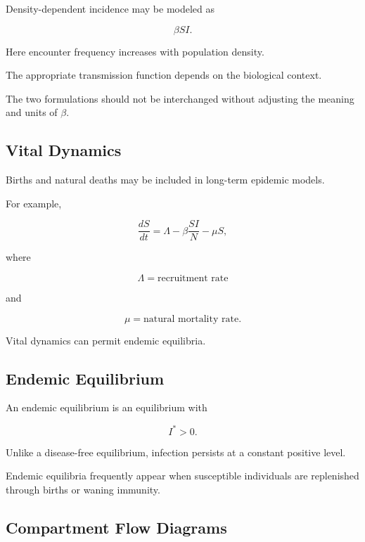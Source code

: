 Density-dependent incidence may be modeled as

\[
\boxed{
\beta SI.
}
\]

Here encounter frequency increases with population density.

The appropriate transmission function depends on the biological context.

The two formulations should not be interchanged without adjusting the
meaning and units of \(\beta\).

\subsection{Vital Dynamics}
\label{subsec:epidemic-vital-dynamics}

Births and natural deaths may be included in long-term epidemic models.

For example,

\[
\frac{dS}{dt}
=
\Lambda
-
\beta\frac{SI}{N}
-
\mu S,
\]

where

\[
\Lambda
=
\text{recruitment rate}
\]

and

\[
\mu
=
\text{natural mortality rate}.
\]

Vital dynamics can permit endemic equilibria.

\subsection{Endemic Equilibrium}
\label{subsec:endemic-equilibrium}

An endemic equilibrium is an equilibrium with

\[
\boxed{
I^*>0.
}
\]

Unlike a disease-free equilibrium, infection persists at a constant positive
level.

Endemic equilibria frequently appear when susceptible individuals are
replenished through births or waning immunity.

\subsection{Compartment Flow Diagrams}
\label{subsec:compartment-flow-diagrams}

